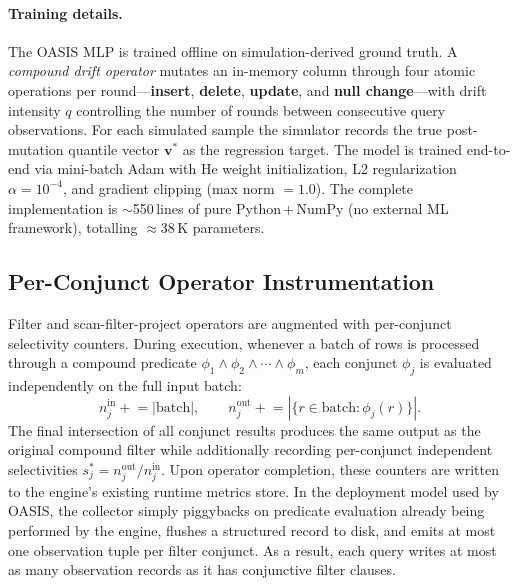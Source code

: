 \paragraph{Training details.}
The OASIS MLP is trained offline on simulation-derived ground truth.
A \emph{compound drift operator} mutates an in-memory column through four
atomic operations per round---\textbf{insert}, \textbf{delete}, \textbf{update},
and \textbf{null change}---with drift intensity $q$ controlling the number of
rounds between consecutive query observations.
For each simulated sample the simulator records the true post-mutation quantile
vector $\mathbf{v}^*$ as the regression target.
The model is trained end-to-end via mini-batch Adam with He weight initialization,
L2 regularization $\alpha{=}10^{-4}$, and gradient clipping (max norm $= 1.0$).
The complete implementation is $\sim$550\,lines of pure Python\,+\,NumPy
(no external ML framework), totalling $\approx$38\,K parameters.

\subsection{Per-Conjunct Operator Instrumentation}

Filter and scan-filter-project operators are augmented with per-conjunct
selectivity counters. During execution, whenever a batch of rows is processed
through a compound predicate $\phi_1 \wedge \phi_2 \wedge \cdots \wedge \phi_m$,
each conjunct $\phi_j$ is evaluated independently on the full input batch:
\[
  n_j^{\text{in}} \mathrel{+}= |\text{batch}|, \qquad
  n_j^{\text{out}} \mathrel{+}= |\{r \in \text{batch} : \phi_j(r)\}|.
\]
The final intersection of all conjunct results produces the same output as
the original compound filter while additionally recording per-conjunct
independent selectivities $s^*_j = n_j^{\text{out}} / n_j^{\text{in}}$.
Upon operator completion, these counters are written to the engine's existing
runtime metrics store. In the deployment model used by OASIS, the collector
simply piggybacks on predicate evaluation already being performed by the
engine, flushes a structured record to disk, and emits at most one
observation tuple per filter conjunct. As a result, each query writes at
most as many observation records as it has conjunctive filter clauses.


